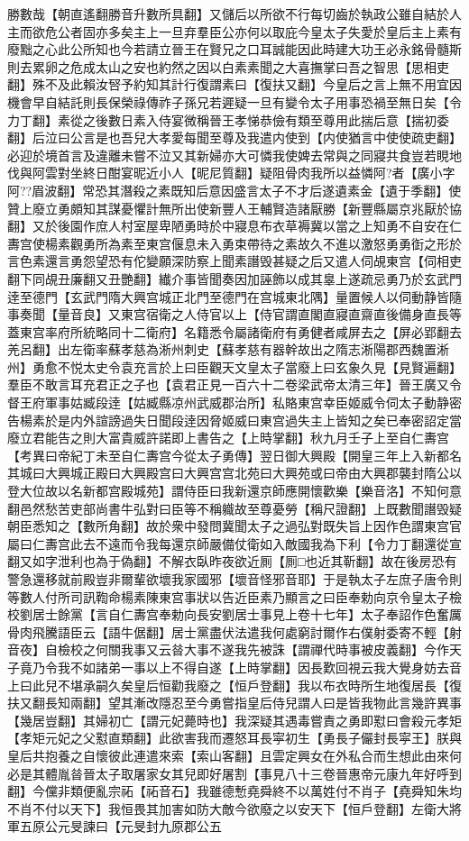 勝數哉【朝直遙翻勝音升數所具翻】又儲后以所欲不行每切齒於執政公雖自結於人主而欲危公者固亦多矣主上一旦弃羣臣公亦何以取庇今皇太子失愛於皇后主上素有廢黜之心此公所知也今若請立晉王在賢兄之口耳誠能因此時建大功王必永銘骨髓斯則去累卵之危成太山之安也約然之因以白素素聞之大喜撫掌曰吾之智思【思相吏翻】殊不及此賴汝唘予約知其計行復謂素曰【復扶又翻】今皇后之言上無不用宜因機會早自結託則長保榮祿傳祚子孫兄若遲疑一旦有變令太子用事恐禍至無日矣【令力丁翻】素從之後數日素入侍宴微稱晉王孝悌恭儉有類至尊用此揣后意【揣初委翻】后泣曰公言是也吾兒大孝愛每聞至尊及我遣内使到【内使猶言中使使疏吏翻】必迎於境首言及違離未嘗不泣又其新婦亦大可憐我使婢去常與之同寢共食豈若睍地伐與阿雲對坐終日酣宴昵近小人【昵尼質翻】疑阻骨肉我所以益憐阿?者【廣小字阿??眉波翻】常恐其潛殺之素既知后意因盛言太子不才后遂遺素金【遺于季翻】使贊上廢立勇頗知其謀憂懼計無所出使新豐人王輔賢造諸厭勝【新豐縣屬京兆厭於協翻】又於後園作庶人村室屋卑陋勇時於中寢息布衣草褥冀以當之上知勇不自安在仁夀宫使楊素觀勇所為素至東宫偃息未入勇束帶待之素故久不進以激怒勇勇衘之形於言色素還言勇怨望恐有佗變願深防察上聞素譖毁甚疑之后又遣人伺覘東宫【伺相吏翻下同覘丑廉翻又丑艷翻】纎介事皆聞奏因加誣飾以成其辠上遂疏忌勇乃於玄武門逹至德門【玄武門隋大興宫城正北門至德門在宫城東北隅】量置候人以伺動静皆隨事奏聞【量音良】又東宫宿衛之人侍官以上【侍官謂直閣直寢直齋直後備身直長等蓋東宫率府所統略同十二衛府】名籍悉令屬諸衛府有勇健者咸屏去之【屏必郢翻去羌呂翻】出左衛率蘇孝慈為淅州刺史【蘇孝慈有器幹故出之隋志淅陽郡西魏置淅州】勇愈不悦太史令袁充言於上曰臣觀天文皇太子當廢上曰玄象久見【見賢遍翻】羣臣不敢言耳充君正之子也【袁君正見一百六十二卷梁武帝太清三年】晉王廣又令督王府軍事姑臧段逹【姑臧縣凉州武威郡治所】私賂東宫幸臣姬威令伺太子動静密告楊素於是内外諠謗過失日聞段逹因脅姬威曰東宫過失主上皆知之矣已奉密詔定當廢立君能告之則大富貴威許諾即上書告之【上時掌翻】秋九月壬子上至自仁夀宫【考異曰帝紀丁未至自仁夀宫今從太子勇傳】翌日御大興殿【開皇三年上入新都名其城曰大興城正殿曰大興殿宫曰大興宫宫北苑曰大興苑或曰帝由大興郡襲封隋公以登大位故以名新都宫殿城苑】謂侍臣曰我新還京師應開懷歡樂【樂音洛】不知何意翻邑然愁苦吏部尚書牛弘對曰臣等不稱軄故至尊憂勞【稱尺證翻】上既數聞譖毁疑朝臣悉知之【數所角翻】故於衆中發問冀聞太子之過弘對既失旨上因作色謂東宫官屬曰仁夀宫此去不遠而令我每還京師嚴備仗衛如入敵國我為下利【令力丁翻還從宣翻又如字泄利也為于偽翻】不解衣臥昨夜欲近厠【厠□也近其靳翻】故在後房恐有警急還移就前殿豈非爾輩欲壞我家國邪【壞音怪邪音耶】于是執太子左庶子唐令則等數人付所司訊鞫命楊素陳東宫事狀以告近臣素乃顯言之曰臣奉勅向京令皇太子檢校劉居士餘黨【言自仁夀宫奉勅向長安劉居士事見上卷十七年】太子奉詔作色奮厲骨肉飛騰語臣云【語牛倨翻】居士黨盡伏法遣我何處窮討爾作右僕射委寄不輕【射音夜】自檢校之何關我事又云㫺大事不遂我先被誅【謂禪代時事被皮義翻】今作天子竟乃令我不如諸弟一事以上不得自遂【上時掌翻】因長歎回視云我大覺身妨去音上曰此兒不堪承嗣久矣皇后恒勸我廢之【恒戶登翻】我以布衣時所生地復居長【復扶又翻長知兩翻】望其漸改隱忍至今勇嘗指皇后侍兒謂人曰是皆我物此言幾許異事【幾居豈翻】其婦初亡【謂元妃薨時也】我深疑其遇毒嘗責之勇即懟曰會殺元孝矩【孝矩元妃之父懟直類翻】此欲害我而遷怒耳長寜初生【勇長子儼封長寜王】朕與皇后共抱養之自懷彼此連遣來索【索山客翻】且雲定興女在外私合而生想此由來何必是其體胤㫺晉太子取屠家女其兒即好屠割【事見八十三卷晉惠帝元康九年好呼到翻】今儻非類便亂宗祏【祏音石】我雖德慙堯舜終不以萬姓付不肖子【堯舜知朱均不肖不付以天下】我恒畏其加害如防大敵今欲廢之以安天下【恒戶登翻】左衛大將軍五原公元旻諫曰【元旻封九原郡公五